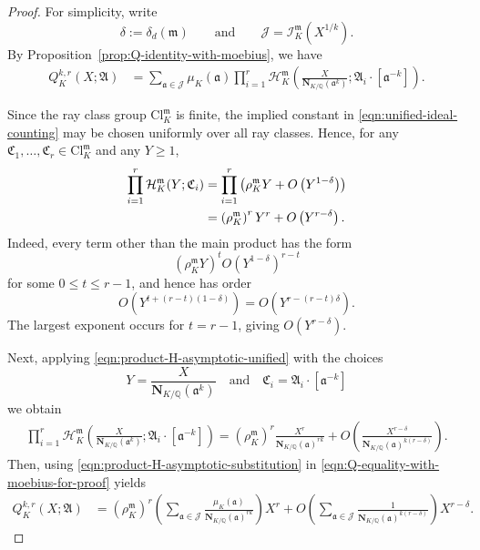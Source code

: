 \documentclass[10pt,a4paper]{amsart}
\newcommand{\Nrm}[2]{\mathbf{N}_{#1}(#2)}
\newcommand{\Q}{\mathbb{Q}}
\begin{document}
\begin{proof}
For simplicity, write
\[
\delta:=\delta_d(\mathfrak{m})
\qquad\text{and}\qquad
\mathcal{J}
=
\mathcal{I}_K^{\mathfrak{m}}\left(X^{1/k}\right).
\]
By Proposition~\ref{prop:Q-identity-with-moebius}, we have
\begin{align}\label{eqn:Q-equality-with-moebius-for-proof}
Q_K^{k,r}(X;\boldsymbol{\mathfrak{A}})
&=
\sum_{\mathfrak{a}\in\mathcal{J}}
\mu_K(\mathfrak{a})
\prod_{i=1}^{r}
\mathcal{H}_K^{\mathfrak{m}}
\left(
\frac{X}{\Nrm{K/\Q}{\mathfrak{a}^k}};
\mathfrak{A}_i\cdot[\mathfrak{a}^{-k}]
\right).
\end{align}

Since the ray class group $\mathrm{Cl}_K^{\mathfrak{m}}$ is finite,
the implied constant in \eqref{eqn:unified-ideal-counting} may be
chosen uniformly over all ray classes. Hence, for any
$\mathfrak{C}_1,\ldots,\mathfrak{C}_r
\in\mathrm{Cl}_K^{\mathfrak{m}}$ and any $Y\geq1$,
\begin{align}
\prod_{i=1}^{r}
\mathcal{H}_K^{\mathfrak{m}}(Y;\mathfrak{C}_i)
&=
\prod_{i=1}^{r}
\left(
\rho_K^{\mathfrak{m}}Y
+
O\left(Y^{1-\delta}\right)
\right)
\notag\\
&=
\left(\rho_K^{\mathfrak{m}}\right)^rY^r
+
O\left(Y^{r-\delta}\right).
\label{eqn:product-H-asymptotic-unified}
\end{align}
Indeed, every term other than the main product has the form
\[
\left(\rho_K^{\mathfrak{m}}Y\right)^t
O\left(Y^{1-\delta}\right)^{r-t}
\]
for some $0\leq t\leq r-1$, and hence has order
\[
O\left(
Y^{t+(r-t)(1-\delta)}
\right)
=
O\left(
Y^{r-(r-t)\delta}
\right).
\]
The largest exponent occurs for $t=r-1$, giving
$O(Y^{r-\delta})$.

Next, applying \eqref{eqn:product-H-asymptotic-unified} with the choices
\[
Y
=
\frac{X}{\Nrm{K/\Q}{\mathfrak{a}^k}} \quad \text{and} \quad \mathfrak{C}_i
=
\mathfrak{A}_i\cdot[\mathfrak{a}^{-k}]
\]
we obtain
\begin{align}\label{eqn:product-H-asymptotic-substitution}
\prod_{i=1}^{r}
\mathcal{H}_K^{\mathfrak{m}}
\left(
\frac{X}{\Nrm{K/\Q}{\mathfrak{a}^k}};
\mathfrak{A}_i\cdot[\mathfrak{a}^{-k}]
\right) =
\left(\rho_K^{\mathfrak{m}}\right)^r
\frac{X^r}
{\Nrm{K/\Q}{\mathfrak{a}}^{rk}}
+
O\left(
\frac{X^{r-\delta}}
{\Nrm{K/\Q}{\mathfrak{a}}^{k(r-\delta)}}
\right).
\end{align}
Then, using \eqref{eqn:product-H-asymptotic-substitution} in
\eqref{eqn:Q-equality-with-moebius-for-proof} yields
\begin{align}
Q_K^{k,r}(X;\boldsymbol{\mathfrak{A}})
&=
\left(\rho_K^{\mathfrak{m}}\right)^r
\left( \sum_{\mathfrak{a}\in\mathcal{J}}
\frac{\mu_K(\mathfrak{a})}
{\Nrm{K/\Q}{\mathfrak{a}}^{rk}}
\right)X^r + O\left( \sum_{\mathfrak{a}\in\mathcal{J}}
\frac{1}{\Nrm{K/\Q}{\mathfrak{a}}^{k(r-\delta)}}\right)
X^{r-\delta}.
\label{eqn:Q-expression-with-two-sums}
\end{align}


\end{proof}
\end{document}
